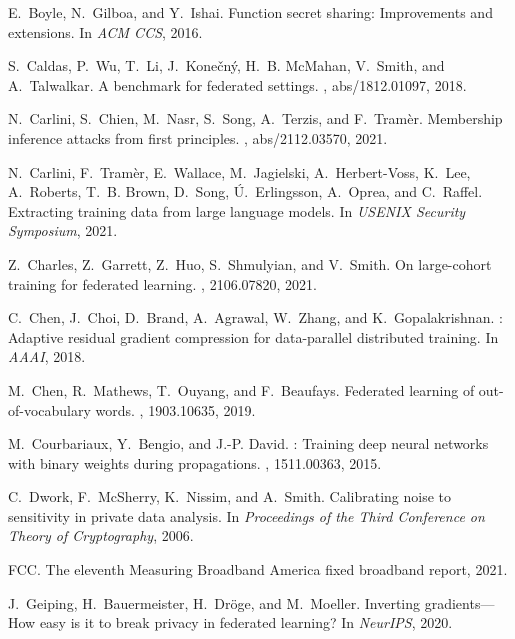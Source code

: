 \documentclass[11pt]{article}
\begin{document}
\begin{thebibliography}{10}
\begin{small}
E.~Boyle, N.~Gilboa, and Y.~Ishai.
\newblock Function secret sharing: Improvements and extensions.
\newblock In {\em ACM CCS}, 2016.

S.~Caldas, P.~Wu, T.~Li, J.~Kone{\v{c}}n{\'y}, H.~B. McMahan, V.~Smith, and
  A.~Talwalkar.
 {A} benchmark for federated settings.
, abs/1812.01097, 2018.

N.~Carlini, S.~Chien, M.~Nasr, S.~Song, A.~Terzis, and F.~Tram{\`{e}}r.
\newblock Membership inference attacks from first principles.
, abs/2112.03570, 2021.

N.~Carlini, F.~Tram{\`{e}}r, E.~Wallace, M.~Jagielski, A.~Herbert{-}Voss,
  K.~Lee, A.~Roberts, T.~B. Brown, D.~Song, {\'{U}}.~Erlingsson, A.~Oprea, and
  C.~Raffel.
\newblock Extracting training data from large language models.
\newblock In {\em {USENIX} Security Symposium}, 2021.

Z.~Charles, Z.~Garrett, Z.~Huo, S.~Shmulyian, and V.~Smith.
\newblock On large-cohort training for federated learning.
, 2106.07820, 2021.

C.~Chen, J.~Choi, D.~Brand, A.~Agrawal, W.~Zhang, and K.~Gopalakrishnan.
: Adaptive residual gradient compression for data-parallel
  distributed training.
\newblock In {\em AAAI}, 2018.

M.~Chen, R.~Mathews, T.~Ouyang, and F.~Beaufays.
\newblock Federated learning of out-of-vocabulary words.
, 1903.10635, 2019.

M.~Courbariaux, Y.~Bengio, and J.-P. David.
: Training deep neural networks with binary weights
  during propagations.
, 1511.00363, 2015.

C.~Dwork, F.~McSherry, K.~Nissim, and A.~Smith.
\newblock Calibrating noise to sensitivity in private data analysis.
\newblock In {\em Proceedings of the Third Conference on Theory of
  Cryptography}, 2006.

FCC.
\newblock The eleventh {Measuring Broadband America} fixed broadband report,
  2021.

J.~Geiping, H.~Bauermeister, H.~Dr\"{o}ge, and M.~Moeller.
\newblock Inverting gradients---{H}ow easy is it to break privacy in federated
  learning?
\newblock In {\em NeurIPS}, 2020.


\end{small}
\end{thebibliography}
\end{document}
